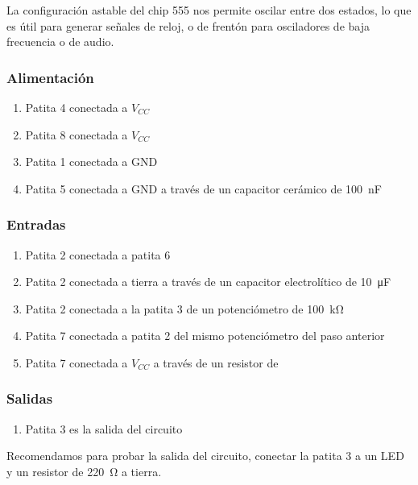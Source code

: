 \documentclass[../principal.tex]{subfiles}
\begin{document}
La configuración astable del chip 555 nos permite oscilar entre dos estados, lo que es útil para generar señales de reloj, o de frentón para osciladores de baja frecuencia o de audio.

\subsubsection{Alimentación}

\begin{enumerate}
    \item Patita 4 conectada a $V_{CC}$
    \item Patita 8 conectada a $V_{CC}$
    \item Patita 1 conectada a GND
    \item Patita 5 conectada a GND a través de un capacitor cerámico de \qty{100}{\nano\farad}
\end{enumerate}

\subsubsection{Entradas}

\begin{enumerate}
    \item Patita 2 conectada a patita 6
    \item Patita 2 conectada a tierra a través de un capacitor electrolítico de \qty{10}{\micro\farad}
    \item Patita 2 conectada a la patita 3 de un potenciómetro de \qty{100}{\kilo\ohm}
    \item Patita 7 conectada a patita 2 del mismo potenciómetro del paso anterior
    \item Patita 7 conectada a $V_{CC}$ a través de un resistor de 
\end{enumerate}


\subsubsection{Salidas}

\begin{enumerate}
    \item Patita 3 es la salida del circuito
\end{enumerate}

Recomendamos para probar la salida del circuito, conectar la patita 3 a un LED y un resistor de \qty{220}{\ohm} a tierra.




\newpage
\end{document}
